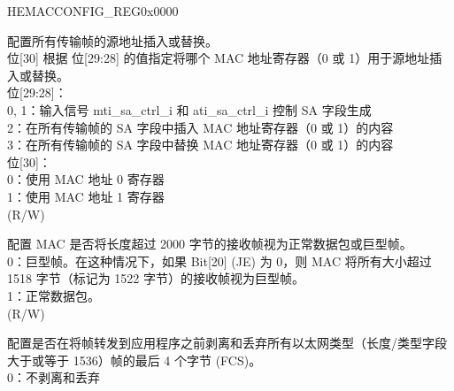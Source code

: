 \begin{register}{H}{EMACCONFIG\_REG}{0x0000}\label{regdesc:EMACCONFIGREG}
%
%
%
%
%
%
%
%
%
%
%
%
%
%
%
%
%
%
%
%
%
%
%
%
%
%
\regnewline%
\begin{regdesc}\begin{reglist}
\item [SAIRC] 配置所有传输帧的源地址插入或替换。\\
位[30] 根据 位[29:28] 的值指定将哪个 MAC 地址寄存器（0 或 1）用于源地址插入或替换。\\
位[29:28]：\\
0, 1：输入信号 mti\_sa\_ctrl\_i 和 ati\_sa\_ctrl\_i 控制 SA 字段生成\\
2：在所有传输帧的 SA 字段中插入 MAC 地址寄存器（0 或 1）的内容\\
3：在所有传输帧的 SA 字段中替换 MAC 地址寄存器（0 或 1）的内容\\
位[30]：\\
0：使用 MAC 地址 0 寄存器\\
1：使用 MAC 地址 1 寄存器\\
(R/W)
\item [ASS2KP] 配置 MAC 是否将长度超过 2000 字节的接收帧视为正常数据包或巨型帧。\\
0：巨型帧。在这种情况下，如果 Bit[20] (JE) 为 0，则 MAC 将所有大小超过 1518 字节（标记为 1522 字节）的接收帧视为巨型帧。\\
1：正常数据包。\\
(R/W)
\item [EMACCRC\_STRIP] 配置是否在将帧转发到应用程序之前剥离和丢弃所有以太网类型（长度/类型字段大于或等于 1536）帧的最后 4 个字节 (FCS)。\\
0：不剥离和丢弃\\

\end{reglist}
\end{regdesc}
\end{register}
